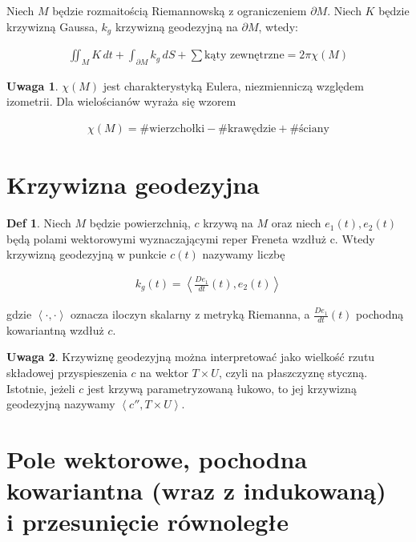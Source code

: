 \documentclass{article}
\theoremstyle{plain}
\theoremstyle{definition}
\newtheorem*{defi*}{Def}
\theoremstyle{definition}
\newtheorem*{not*}{Uwaga}
\begin{document}
Niech $M$ będzie rozmaitością Riemannowską z ograniczeniem $\partial M$. Niech $K$ będzie krzywizną Gaussa, $k_g$ krzywizną geodezyjną na $\partial M$, wtedy:

\begin{align*} 
\iint_M K \,dt + \int_{\partial M} k_g \,dS + \sum \text{kąty zewnętrzne} = 2\pi \chi(M)
\end{align*}

\begin{not*}
$\chi (M)$ jest charakterystyką Eulera, niezmienniczą względem izometrii. Dla wielościanów wyraża się wzorem

\begin{align*}
    \chi (M) = \# \text{wierzchołki} - \# \text{krawędzie} + \# \text{ściany}
\end{align*}

\end{not*}


\section{Krzywizna geodezyjna}

\begin{defi*}
Niech $M$ będzie powierzchnią, $c$ krzywą na $M$ oraz niech $e_1(t), e_2(t)$ będą polami wektorowymi wyznaczającymi reper Freneta wzdłuż c. Wtedy krzywizną geodezyjną w punkcie $c(t)$ nazywamy liczbę

\begin{align*}
    k_g(t) = \left< \frac{De_1}{dt}(t), e_2(t) \right>
\end{align*}

\noindent gdzie $\left< \cdot , \cdot  \right>$ oznacza iloczyn skalarny z metryką Riemanna, a 
 $\frac{De_1}{dt}(t)$ pochodną kowariantną wzdłuż $c$.
\end{defi*}

\begin{not*}
Krzywiznę geodezyjną można interpretować jako wielkość rzutu składowej przyspieszenia $c$ na wektor $T \times U$, czyli na płaszczyznę styczną. Istotnie, jeżeli $c$ jest krzywą parametryzowaną łukowo, to jej krzywizną geodezyjną nazywamy $\left< c'', T \times U \right>$.
\end{not*}

\section{Pole wektorowe, pochodna kowariantna (wraz z indukowaną)\\ i przesunięcie równoległe}
\end{document}
